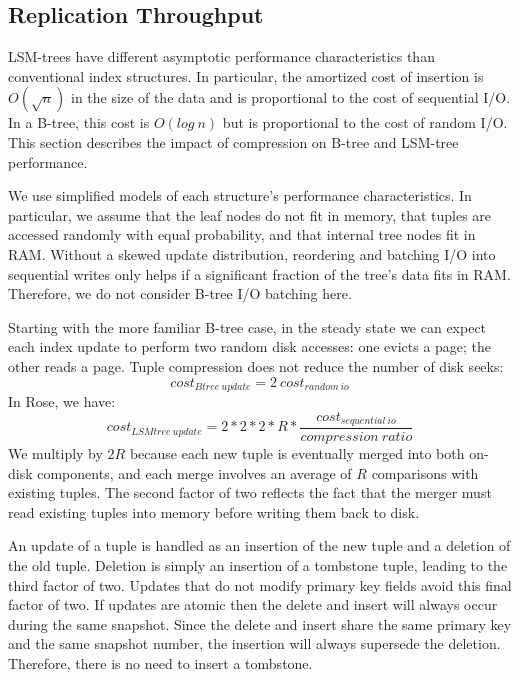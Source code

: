 \documentclass{vldb}
\newcommand{\rows}{Rose\xspace}
\begin{document}
\subsection{Replication Throughput}

LSM-trees have different asymptotic performance characteristics than
conventional index structures.  In particular, the amortized cost of
insertion is $O(\sqrt{n})$ in the size of the data and is proportional
 to the cost of sequential I/O.  In a B-tree, this cost is
$O(log~n)$ but is proportional to the cost of random I/O.
This section describes the impact of compression on B-tree
and LSM-tree performance.

We use simplified models of each structure's performance
characteristics.  In particular, we assume that the leaf nodes do not
fit in memory, that tuples are accessed randomly with equal
probability, and that internal tree nodes fit in RAM.  Without a
skewed update distribution, reordering and batching I/O into
sequential writes only helps if a significant fraction of the tree's
data fits in RAM.  Therefore, we do not consider B-tree I/O batching
here.

Starting with the more familiar B-tree case, in the steady state we
can expect each index update to perform two random disk accesses: one
evicts a page; the other reads a page.  Tuple compression does not
reduce the number of disk seeks:
\[
   cost_{Btree~update}=2~cost_{random~io}
\]
In \rows, we have:
\[
   cost_{LSMtree~update}=2*2*2*R*\frac{cost_{sequential~io}}{compression~ratio}  %
\]
We multiply by $2R$ because each new
tuple is eventually merged into both on-disk components, and
each merge involves an average of $R$ comparisons with existing tuples.
The second factor of two reflects the fact that the merger must read
existing tuples into memory before writing them back to disk.

An update of a tuple is handled as an insertion of the new
tuple and a deletion of the old tuple.  Deletion is simply an insertion
of a tombstone tuple, leading to the third factor of two.
Updates that do not modify primary key fields avoid this final factor
of two.  If updates are atomic then the delete and insert
will always occur during the same snapshot.  Since the delete and
insert share the same primary key and the same snapshot number, the
insertion will always supersede the deletion.  Therefore, there is no
need to insert a tombstone.
\end{document}
